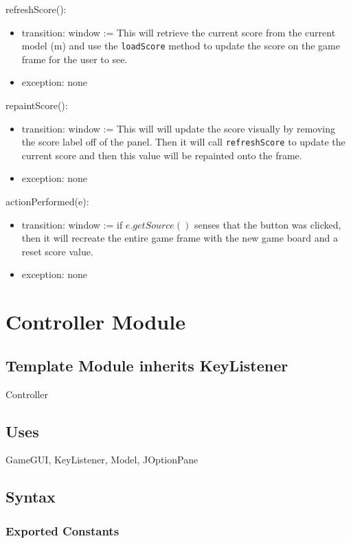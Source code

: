 \documentclass[12pt]{article}
\begin{document}
\noindent refreshScore():
\begin{itemize}
\item transition: window := This will retrieve the current score from the current model (m) and use the \verb|loadScore| method to update the score on the game frame for the user to see.
\item exception: none
\end{itemize}

\noindent repaintScore():
\begin{itemize}
\item transition: window := This will will update the score visually by removing the score label off of the panel. Then it will call \verb|refreshScore| to update the current score and then this value will be repainted onto the frame.
\item exception: none
\end{itemize}

\noindent actionPerformed(e):
\begin{itemize}
\item transition: window := if $e.getSource()$ senses that the button was clicked, then it will recreate the entire game frame with the new game board and a reset score value.
\item exception: none
\end{itemize}

\newpage

\section* {Controller Module}

\subsection*{Template Module inherits KeyListener}

Controller

\subsection* {Uses}

GameGUI, KeyListener, Model, JOptionPane

\subsection* {Syntax}

\subsubsection* {Exported Constants}
\end{document}
